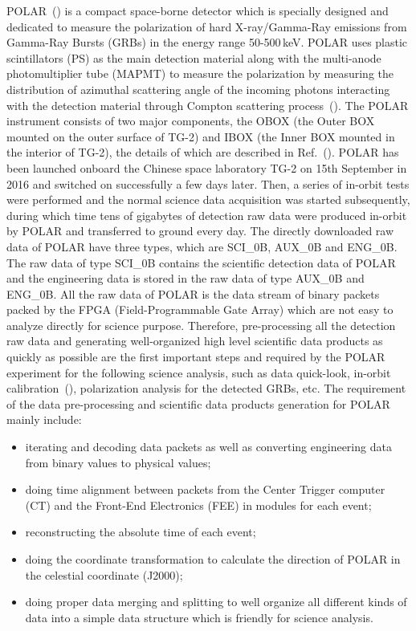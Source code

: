 \documentclass{raa}
\begin{document}
POLAR~(\citealt{PRODUIT2005616}) is a compact space-borne detector which is specially designed and dedicated to measure the polarization of hard X-ray/Gamma-Ray emissions from Gamma-Ray Bursts (GRBs) in the energy range 50-500\,keV. POLAR uses plastic scintillators (PS) as the main detection material along with the multi-anode photomultiplier tube (MAPMT) to measure the polarization by measuring the distribution of azimuthal scattering angle of the incoming photons interacting with the detection material through Compton scattering process~(\citealt{Xiong2009}). The POLAR instrument consists of two major components, the OBOX (the Outer BOX mounted on the outer surface of TG-2) and IBOX (the Inner BOX mounted in the interior of TG-2), the details of which are described in Ref.~(\citealt{Produit2017}). POLAR has been launched onboard the Chinese space laboratory TG-2 on 15th September in 2016 and switched on successfully a few days later. Then, a series of in-orbit tests were performed and the normal science data acquisition was started subsequently, during which time tens of gigabytes of detection raw data were produced in-orbit by POLAR and transferred to ground every day. The directly downloaded raw data of POLAR have three types, which are SCI\_0B, AUX\_0B and ENG\_0B. The raw data of type SCI\_0B contains the scientific detection data of POLAR and the engineering data is stored in the raw data of type AUX\_0B and ENG\_0B. All the raw data of POLAR is the data stream of binary packets packed by the FPGA (Field-Programmable Gate Array) which are not easy to analyze directly for science purpose. Therefore, pre-processing all the detection raw data and generating well-organized high level scientific data products as quickly as possible are the first important steps and required by the POLAR experiment for the following science analysis, such as data quick-look, in-orbit calibration~(\citealt{LI20188}), polarization analysis for the detected GRBs, etc. The requirement of the data pre-processing and scientific data products generation for POLAR mainly include:
\begin{itemize}
\item iterating and decoding data packets as well as converting engineering data from binary values to physical values;
\item doing time alignment between packets from the Center Trigger computer (CT) and the Front-End Electronics (FEE) in modules for each event;
\item reconstructing the absolute time of each event;
\item doing the coordinate transformation to calculate the direction of POLAR in the celestial coordinate (J2000);
\item doing proper data merging and splitting to well organize all different kinds of data into a simple data structure which is friendly for science analysis.
\end{itemize}
\end{document}
